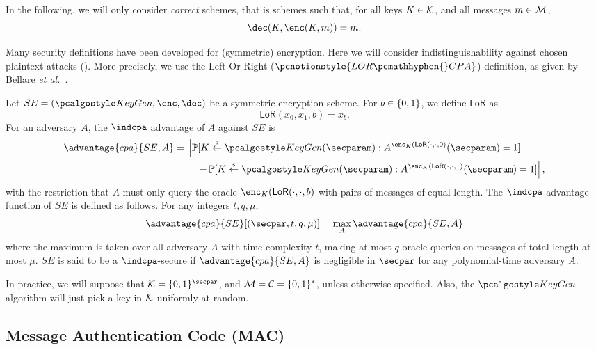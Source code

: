 In the following, we will only consider \emph{correct} schemes, that is schemes such that, for all keys $K \in \mathcal{K}$, and all messages $m \in \mathcal{M}$, 
\[
	\Dec(K,\Enc(K,m)) = m.
\]

Many security definitions have been developed for (symmetric) encryption.
Here we will consider indistinguishability against chosen plaintext attacks (\indcpa).
More precisely, we use the Left-Or-Right ($\pcnotionstyle{LOR\pcmathhyphen{}CPA}$) definition, as given by Bellare \emph{et al.}~\cite{FOCS:BDJR97}.

\begin{definition}
	\label{def:ind-cpa}
	Let $SE = (\KeyGen, \Enc, \Dec)$ be a symmetric encryption scheme.
	For $b \in \{0,1\}$, we define $\mathsf{LoR}$ as
	\[
		\mathsf{LoR}(x_0,x_1,b) = x_b.
	\]
	For an adversary $A$, the $\indcpa$ advantage of $A$ against $SE$ is
	\[
		\advantage{cpa}{SE,A} = 
		\begin{multlined}[t]
		\left|  \Prob[K \getsr \KeyGen(\secparam) :  A^{\Enc_K(\mathsf{LoR}(\cdot,\cdot,0)}(\secparam) = 1] \right. \\
			 \left. - \Prob[ K \getsr \KeyGen(\secparam) :  A^{\Enc_K(\mathsf{LoR}(\cdot,\cdot,1)}(\secparam) = 1 ] \right|,
			 \end{multlined}
	\]
	with the restriction that $A$ must only query the oracle $\Enc_K(\mathsf{LoR}(\cdot,\cdot,b)$ with pairs of messages of equal length.
	The $\indcpa$ advantage function of $SE$ is defined as follows. For any integers $t,q, \mu$,
	\[
		\advantage{cpa}{SE}[(\secpar, t, q, \mu)] = \max_{A} \advantage{cpa}{SE, A}
	\]
	where the maximum is taken over all adversary $A$ with time complexity $t$, making at most $q$ oracle queries on messages of total length at most $\mu$.
	$SE$ is said to be a $\indcpa$-secure if $\advantage{cpa}{SE, A}$ is negligible in $\secpar$ for any polynomial-time adversary $A$.
\end{definition}



In practice, we will suppose that $\cK = \zo^{\secpar}$, and $\mathcal{M} = \mathcal{C} = \{0,1\}^*$, unless otherwise specified.
Also, the $\KeyGen$ algorithm will just pick a key in $\mathcal{K}$ uniformly at random.


\subsection{Message Authentication Code (MAC)} %
\label{sub:def_mac}

